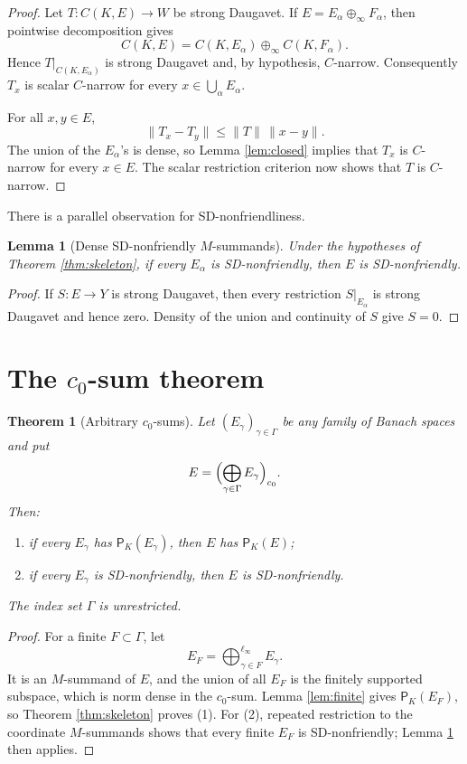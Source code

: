\documentclass[11pt]{article}
\newtheorem{theorem}{Theorem}
\newtheorem{lemma}{Lemma}
\begin{document}
\begin{proof}
Let \(T:C(K,E)\to W\) be strong Daugavet.  If
\(E=E_\alpha\oplus_\infty F_\alpha\), then pointwise decomposition gives
\[
 C(K,E)=C(K,E_\alpha)\oplus_\infty C(K,F_\alpha).
\]
Hence \(T|_{C(K,E_\alpha)}\) is strong Daugavet and, by hypothesis,
\(C\)-narrow.  Consequently \(T_x\) is scalar \(C\)-narrow for every
\(x\in\bigcup_\alpha E_\alpha\).

For all \(x,y\in E\),
\[
 \|T_x-T_y\|\leq \|T\|\,\|x-y\|.
\]
The union of the \(E_\alpha\)'s is dense, so Lemma \ref{lem:closed} implies
that \(T_x\) is \(C\)-narrow for every \(x\in E\).  The scalar restriction
criterion now shows that \(T\) is \(C\)-narrow.
\end{proof}

There is a parallel observation for SD-nonfriendliness.

\begin{lemma}[Dense SD-nonfriendly \(M\)-summands]
\label{lem:sd}
Under the hypotheses of Theorem \ref{thm:skeleton}, if every \(E_\alpha\)
is SD-nonfriendly, then \(E\) is SD-nonfriendly.
\end{lemma}

\begin{proof}
If \(S:E\to Y\) is strong Daugavet, then every restriction
\(S|_{E_\alpha}\) is strong Daugavet and hence zero.  Density of the union
and continuity of \(S\) give \(S=0\).
\end{proof}

\section*{The \(c_0\)-sum theorem}

\begin{theorem}[Arbitrary \(c_0\)-sums]
\label{thm:c0}
Let \((E_\gamma)_{\gamma\in\Gamma}\) be any family of Banach spaces and put
\[
 E=\Bigl(\bigoplus_{\gamma\in\Gamma}E_\gamma\Bigr)_{c_0}.
\]
Then:
\begin{enumerate}
\item if every \(E_\gamma\) has \(\mathsf P_K(E_\gamma)\), then \(E\) has
\(\mathsf P_K(E)\);
\item if every \(E_\gamma\) is SD-nonfriendly, then \(E\) is
SD-nonfriendly.
\end{enumerate}
The index set \(\Gamma\) is unrestricted.
\end{theorem}

\begin{proof}
For a finite \(F\subset\Gamma\), let
\[
 E_F=\bigoplus_{\gamma\in F}^{\ell_\infty}E_\gamma.
\]
It is an \(M\)-summand of \(E\), and the union of all \(E_F\) is the finitely
supported subspace, which is norm dense in the \(c_0\)-sum.  Lemma
\ref{lem:finite} gives \(\mathsf P_K(E_F)\), so Theorem
\ref{thm:skeleton} proves (1).  For (2), repeated restriction to the
coordinate \(M\)-summands shows that every finite \(E_F\) is SD-nonfriendly;
Lemma \ref{lem:sd} then applies.
\end{proof}
\end{document}
